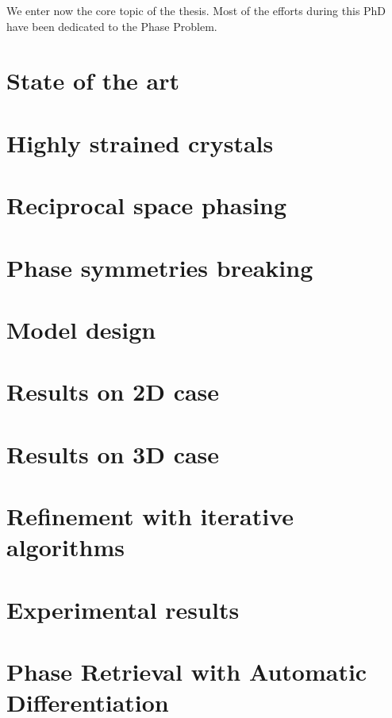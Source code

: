 We enter now the core topic of the thesis. Most of the efforts during this PhD have been dedicated to the Phase Problem.
\section{State of the art}\label{chp:phasing}
\section{Highly strained crystals}\label{chp:phasing}
\section{Reciprocal space phasing}\label{chp:phasing}
\section{Phase symmetries breaking}\label{chp:phasing}
\section{Model design}\label{chp:phasing}
\section{Results on 2D case}\label{chp:phasing}
\section{Results on 3D case}\label{chp:phasing}
\section{Refinement with iterative algorithms}\label{chp:phasing}
\section{Experimental results}\label{chp:phasing}
\section{Phase Retrieval with Automatic Differentiation}

